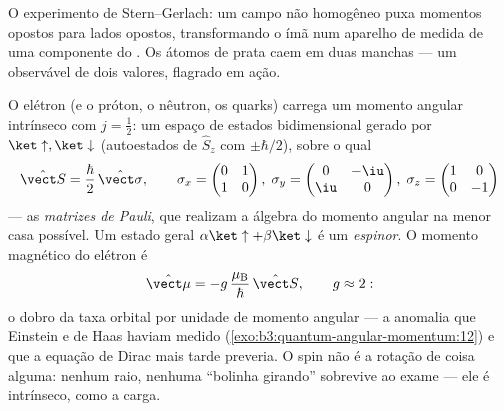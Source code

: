 \begin{omfigure}

{\small O experimento de Stern--Gerlach: um campo não homogêneo puxa
momentos opostos para lados opostos, transformando o ímã num aparelho
de medida de uma componente do . Os átomos de prata caem em duas
manchas --- um observável de dois valores, flagrado em ação.}
\end{omfigure}

\begin{definition}\label{def:b3:spin-two-level:spin}
O elétron (e o próton, o nêutron, os quarks) carrega um momento angular
intrínseco com $j = \tfrac12$: um espaço de estados bidimensional
gerado por $\ket\uparrow, \ket\downarrow$ (autoestados de $\hat S_z$
com $\pm\hbar/2$), sobre o qual
\[
\hat{\vect S} = \frac\hbar2\,\hat{\vect\sigma} , \qquad
\sigma_x = \begin{pmatrix}0&1\\1&0\end{pmatrix} ,\;
\sigma_y = \begin{pmatrix}0&-\iu\\\iu&0\end{pmatrix} ,\;
\sigma_z = \begin{pmatrix}1&0\\0&-1\end{pmatrix}
\]
--- as \emph{matrizes de Pauli}, que realizam a álgebra do momento
angular na menor casa possível. Um estado geral
$\alpha\ket\uparrow + \beta\ket\downarrow$ é um \emph{espinor}. O
momento magnético do elétron é
\[
\hat{\vect\mu} = -g\,\frac{\mu_{\text{B}}}{\hbar}\,\hat{\vect S} ,
\qquad g \approx 2 :
\]
o dobro da taxa orbital por unidade de momento angular --- a anomalia
que Einstein e de Haas haviam medido
(\cref{exo:b3:quantum-angular-momentum:12}) e que a equação de Dirac
mais tarde preveria. O spin não é a rotação de coisa alguma: nenhum
raio, nenhuma ``bolinha girando'' sobrevive ao exame --- ele é
intrínseco, como a carga.
\end{definition}

